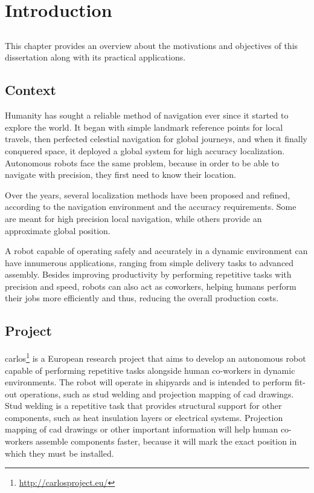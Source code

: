 \chapter{Introduction} \label{chap:introduction}



\section*{}

This chapter provides an overview about the motivations and objectives of this dissertation along with its practical applications.



\section{Context} \label{sec:introduction_context}

Humanity has sought a reliable method of navigation ever since it started to explore the world. It began with simple landmark reference points for local travels, then perfected celestial navigation for global journeys, and when it finally conquered space, it deployed a global system for high accuracy localization. Autonomous robots face the same problem, because in order to be able to navigate with precision, they first need to know their location.

Over the years, several localization methods have been proposed and refined, according to the navigation environment and the accuracy requirements. Some are meant for high precision local navigation, while others provide an approximate global position.

A robot capable of operating safely and accurately in a dynamic environment can have innumerous applications, ranging from simple delivery tasks to advanced assembly. Besides improving productivity by performing repetitive tasks with precision and speed, robots can also act as coworkers, helping humans perform their jobs more efficiently and thus, reducing the overall production costs.



\section{Project} \label{sec:introduction_project}

\gls{carlos}\footnote{\url{http://carlosproject.eu/}} is a European research project that aims to develop an autonomous robot capable of performing repetitive tasks alongside human co-workers in dynamic environments. The robot will operate in shipyards and is intended to perform fit-out operations, such as stud welding and projection mapping of \gls{cad} drawings. Stud welding is a repetitive task that provides structural support for other components, such as heat insulation layers or electrical systems. Projection mapping of \gls{cad} drawings or other important information will help human co-workers assemble components faster, because it will mark the exact position in which they must be installed.



